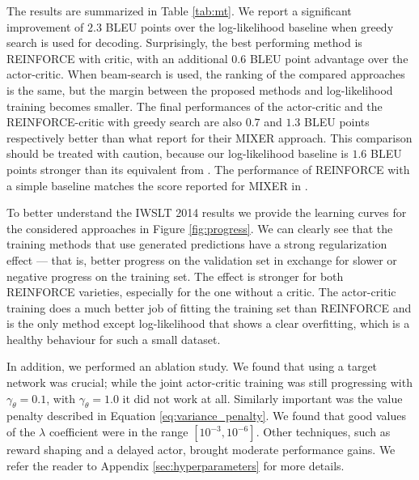\documentclass{article} \usepackage{iclr2017_conference,times}
\begin{document}
The results are summarized in Table \ref{tab:mt}. We report
a significant improvement of $2.3$ BLEU points over the log-likelihood baseline
when greedy search is used for decoding. Surprisingly, the best performing method
is REINFORCE with critic, with an additional $0.6$ BLEU point advantage
over the actor-critic. When beam-search is used, the ranking of the compared approaches
is the same, but the margin between the proposed methods and log-likelihood training
becomes smaller.  The final performances of the actor-critic and the
REINFORCE-critic with greedy search are also $0.7$ and $1.3$ BLEU points
respectively better than what \citet{ranzato2015sequence} report for their
MIXER approach.  This comparison should be treated with caution,
because our log-likelihood baseline is $1.6$ BLEU points stronger
than its equivalent from \citep{ranzato2015sequence}. The performance
of REINFORCE with a simple baseline matches the score reported for MIXER in
\citet{ranzato2015sequence}.

To better understand the IWSLT 2014 results we provide
the learning curves for the considered approaches in Figure
\ref{fig:progress}. We can clearly see that the training methods that use
generated predictions have a strong regularization effect --- that is, better
progress on the validation set in exchange for slower or negative progress on
the training set. The effect is stronger for both REINFORCE varieties, 
especially for the one without a critic. The actor-critic training does a 
much better job of fitting the training set than REINFORCE and is the only
method except log-likelihood that shows a clear overfitting, which is a healthy 
behaviour for such a small dataset.

In addition, we performed an ablation study.  We found that using a target network was crucial;  while
the joint actor-critic training was still progressing with $\gamma_{\theta}=0.1$, 
with $\gamma_{\theta}=1.0$ it did not work at all. Similarly
important was the value penalty described in Equation
\eqref{eq:variance_penalty}. We found that good values of the $\lambda$ coefficient
were in the range $[10^{-3}, 10^{-6}]$.  Other
techniques, such as reward shaping and a delayed actor, brought moderate
performance gains. We refer the reader to Appendix \ref{sec:hyperparameters} for more details.
\end{document}
